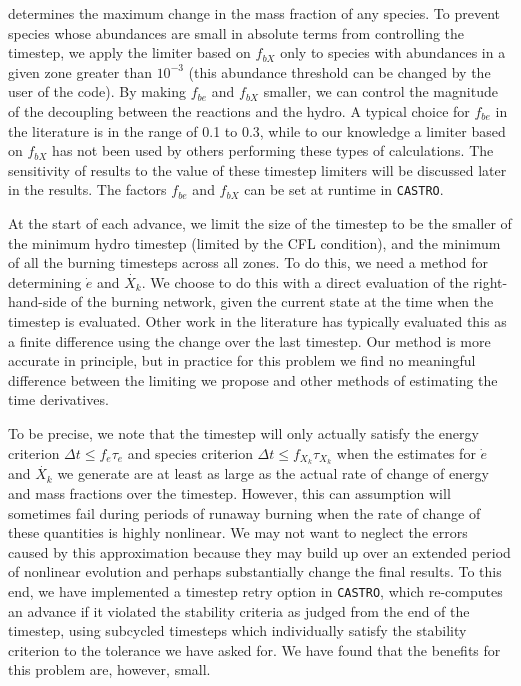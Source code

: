 \documentclass[twocolumn,numberedappendix]{../aastex62}
\newcommand{\castro}{\texttt{CASTRO}}
\begin{document}
determines the maximum change in the mass fraction of any species. To prevent species
whose abundances are small in absolute terms from controlling the timestep, we apply
the limiter based on $f_{bX}$ only to species with abundances in a given zone greater
than $10^{-3}$ (this abundance threshold can be changed by the user of the code). By making 
$f_{be}$ and $f_{bX}$ smaller, we can control the magnitude of the decoupling 
between the reactions and the hydro. A typical choice for $f_{be}$ in the
literature is in the range of 0.1 to 0.3, while to our knowledge a limiter based on
$f_{bX}$ has not been used by others performing these types of calculations. The sensitivity
of results to the value of these timestep limiters will be discussed later in the
results. The factors $f_{be}$ and $f_{bX}$ can be set at runtime in \castro.

At the start of each advance, we limit the size of the timestep to be the smaller
of the minimum hydro timestep (limited by the CFL condition), and the minimum of all the
burning timesteps across all zones. To do this, we need a method for determining 
$\dot{e}$ and $\dot{X_k}$. We choose to do this with a direct evaluation of the
right-hand-side of the burning network, given the current state at the time when
the timestep is evaluated. Other work in the literature has typically evaluated
this as a finite difference using the change over the last timestep. Our method
is more accurate in principle, but in practice for this problem we find no
meaningful difference between the limiting we propose and other methods of
estimating the time derivatives.

To be precise, we note that the timestep
will only actually satisfy the energy criterion
$\Delta t \leq f_e \tau_e$ and species criterion
$\Delta t \leq f_{X_k} \tau_{X_k}$ when the estimates for
$\dot{e}$ and $\dot{X_k}$ we generate are at least as large
as the actual rate of change of energy and mass fractions
over the timestep. However, this can assumption will sometimes fail
during periods of runaway burning when the rate of change
of these quantities is highly nonlinear. We may not want
to neglect the errors caused by this approximation
because they may build up over an extended period of nonlinear
evolution and perhaps substantially change the final results.
To this end, we have implemented a timestep retry option in
\castro, which re-computes an advance if it violated the
stability criteria as judged from the end of the timestep,
using subcycled timesteps which individually satisfy the
stability criterion to the tolerance we have asked for.
We have found that the benefits for this problem are, however, small.
\end{document}
